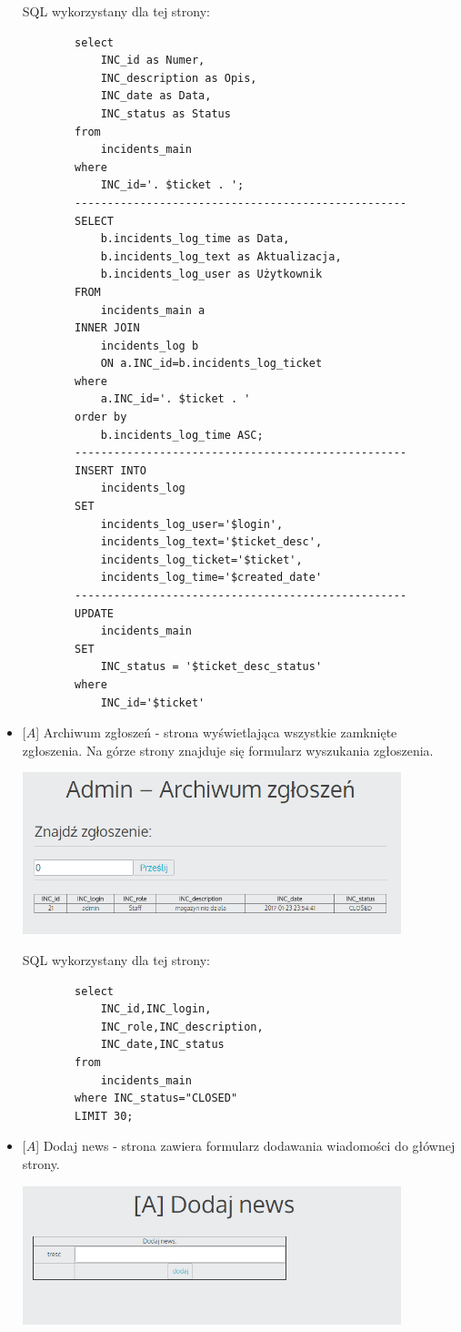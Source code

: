 \documentclass[10pt,a4paper]{article}
\begin{document}
\begin{itemize}
		SQL wykorzystany dla tej strony:
		\begin{lstlisting}
		select 
			INC_id as Numer, 
			INC_description as Opis, 
			INC_date as Data, 
			INC_status as Status 
		from 
			incidents_main 
		where 
			INC_id='. $ticket . ';
		---------------------------------------------------
		SELECT 
			b.incidents_log_time as Data, 
			b.incidents_log_text as Aktualizacja, 
			b.incidents_log_user as Użytkownik 
		FROM 
			incidents_main a 
		INNER JOIN 
			incidents_log b 
			ON a.INC_id=b.incidents_log_ticket 
		where 
			a.INC_id='. $ticket . ' 
		order by 
			b.incidents_log_time ASC; 
		---------------------------------------------------
		INSERT INTO 
			incidents_log 
		SET 
			incidents_log_user='$login', 
			incidents_log_text='$ticket_desc', 
			incidents_log_ticket='$ticket', 
			incidents_log_time='$created_date' 
		---------------------------------------------------
		UPDATE 
			incidents_main 
		SET 
			INC_status = '$ticket_desc_status' 
		where 
			INC_id='$ticket'
		\end{lstlisting}
		
		
		\item $[A$] Archiwum zgłoszeń - strona wyświetlająca wszystkie zamknięte zgłoszenia. Na górze strony znajduje się formularz wyszukania zgłoszenia.
		
	\includegraphics[width=11cm]{12}
		
		SQL wykorzystany dla tej strony:
		\begin{lstlisting}
		select 
			INC_id,INC_login,
			INC_role,INC_description,
			INC_date,INC_status 
		from 
			incidents_main 
		where INC_status="CLOSED" 
		LIMIT 30;
		\end{lstlisting}
		\newpage
		\item $[A$] Dodaj news - strona zawiera formularz dodawania wiadomości do głównej strony. 
		
		\includegraphics[width=11cm]{13}
		

\end{itemize}
\end{document}
